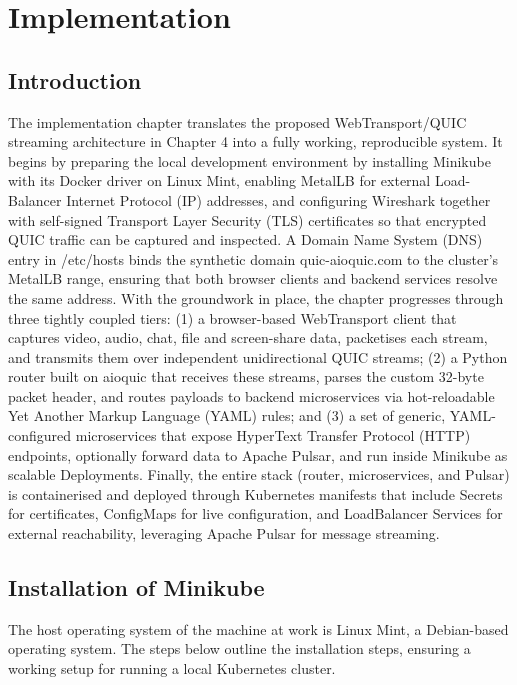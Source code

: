 \chapter{Implementation}

\section{Introduction}
The implementation chapter translates the proposed WebTransport/QUIC streaming architecture in Chapter 4 into a fully working, reproducible system. It begins by preparing the local development environment by installing Minikube \cite{minikube-docs} with its Docker driver on Linux Mint, enabling MetalLB \cite{metallb-docs} for external Load-Balancer Internet Protocol (IP) addresses, and configuring Wireshark \cite{wireshark-docs} together with self-signed Transport Layer Security (TLS) certificates so that encrypted QUIC traffic can be captured and inspected. A Domain Name System (DNS) entry in /etc/hosts binds the synthetic domain quic-aioquic.com to the cluster’s MetalLB range, ensuring that both browser clients and backend services resolve the same address. With the groundwork in place, the chapter progresses through three tightly coupled tiers: (1) a browser-based WebTransport client that captures video, audio, chat, file and screen-share data, packetises each stream, and transmits them over independent unidirectional QUIC streams; (2) a Python router built on aioquic \cite{aioquic-repo} that receives these streams, parses the custom 32-byte packet header, and routes payloads to backend microservices via hot-reloadable Yet Another Markup Language (YAML) rules; and (3) a set of generic, YAML-configured microservices that expose HyperText Transfer Protocol (HTTP) endpoints, optionally forward data to Apache Pulsar, and run inside Minikube as scalable Deployments. Finally, the entire stack (router, microservices, and Pulsar) is containerised and deployed through Kubernetes manifests that include Secrets for certificates, ConfigMaps for live configuration, and LoadBalancer Services for external reachability, leveraging Apache Pulsar \cite{pulsar-helm-repo} for message streaming.


\section{Installation of Minikube}
The host operating system of the machine at work is Linux Mint, a Debian-based operating system. The steps below outline the installation steps, ensuring a working setup for running a local Kubernetes cluster.


